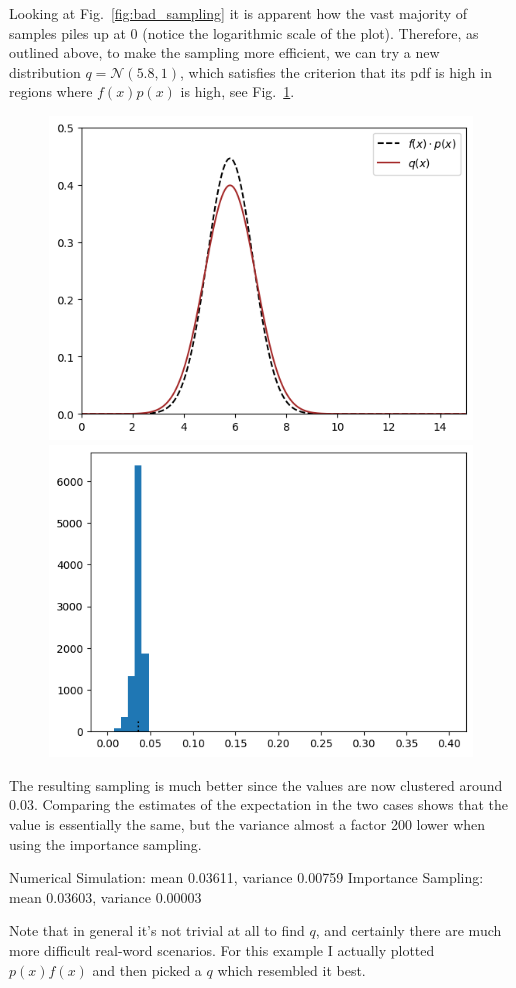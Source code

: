 \documentclass[12pt,a4paper]{article}
\begin{document}
Looking at Fig.~\ref{fig:bad_sampling} it is apparent how the vast majority of samples piles up at 0 (notice the logarithmic scale of the plot). 
Therefore, as outlined above, to make the sampling more efficient, we can try a new distribution $q = \mathcal{N}(5.8, 1)$, which satisfies the criterion that its pdf is high in regions where $f(x)p(x)$ is high, see Fig.~\ref{fig:fp_and_q}.

\begin{figure}[htbp]
\begin{center}
\includegraphics[width=0.4\linewidth]{addons/fp_and_q}
\includegraphics[width=0.4\linewidth]{addons/good_sampling}
\end{center}
\label{fig:fp_and_q}
\end{figure}

The resulting sampling is much better since the values are now clustered around 0.03. Comparing the estimates of the expectation in the two cases shows that the value is essentially the same, but the variance almost a factor 200 lower when using the importance sampling.
\begin{ioutput}
Numerical Simulation: mean 0.03611, variance 0.00759
Importance Sampling: mean 0.03603, variance 0.00003
\end{ioutput}
Note that in general it’s not trivial at all to find $q$, and certainly there are much more difficult real-word scenarios. For this example I actually plotted $p(x)f(x)$ and then picked a $q$ which resembled it best.
\end{document}
